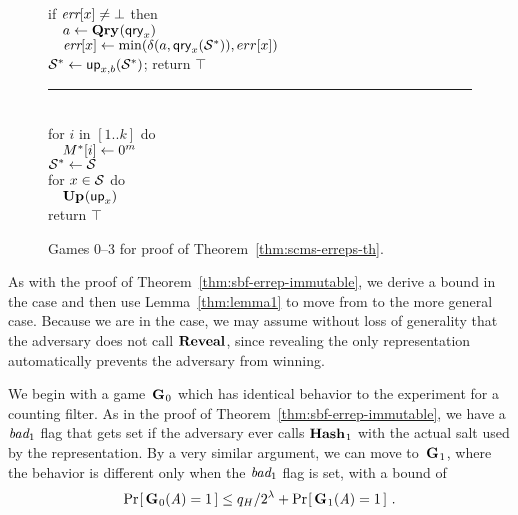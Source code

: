 \begin{figure*}
{    if $\textit{err}[x] \neq \bot$ then\\
      $\hspace*{10pt} a \gets \textup{\textbf{Qry}}\hspace{0.5pt}(\mathsf{qry}_x)$\\
      $\hspace*{10pt}\textit{err}[x] \gets \min(\delta(a,\mathsf{qry}_x(\mathcal{S}^*)),err[x])$\\
    $\mathcal{S}^* \gets \mathsf{up}_{x,b}(\mathcal{S}^*)$;
    return $\top$
  \vspace{6pt}\hrule\vspace{3pt}
  \oraclev{$\REPO(\col)$}\hfill{}\\[2pt]
    for $i$ in $[1..k]$ do\\
      $\hspace*{10pt} M^*[i] \gets 0^m$\\
    $\mathcal{S}^* \gets \mathcal{S}$\\
    for $x \in \mathcal{S}$ do\\
    $\hspace*{10pt}\textup{\textbf{Up}}\hspace{0.5pt}(\mathsf{up}_x)$\\
    return $\top$
}
\caption{Games 0--3 for proof of Theorem~\ref{thm:scms-erreps-th}.}
\label{fig:sbf-erreps/games}
\end{figure*}

As with the proof of Theorem~\ref{thm:sbf-errep-immutable}, we derive a bound in
the  case and then use Lemma~\ref{thm:lemma1} to move from  to
the more general \erreps case. Because we are in the  case, we may
assume without loss of generality that the adversary does not call $\mathbf{Reveal}$,
since revealing the only representation automatically prevents the adversary
from winning.

We begin with a game~$\textup{\textbf{G}}\hspace{0.5pt}_0$ which has identical behavior to the 
experiment for a counting filter. As in the proof of
Theorem~\ref{thm:sbf-errep-immutable}, we have a
$\textit{bad}_1$ flag that gets set if the adversary ever calls $\textup{\textbf{Hash}}\hspace{0.5pt}_1$ with the
actual salt used by the representation. By a very similar argument, we can
move to~$\textup{\textbf{G}}\hspace{0.5pt}_1$, where the behavior is different only when the $\textit{bad}_1$ flag
is set, with a bound of
\begin{equation}
  \Pr\hspace{-1pt}\left[\,\textup{\textbf{G}}\hspace{0.5pt}_0(\mathit{A})=1\,\right] \leq
    q_H/2^\lambda + \Pr\hspace{-1pt}\left[\,\textup{\textbf{G}}\hspace{0.5pt}_1(\mathit{A})=1\,\right] \,.
\end{equation}

